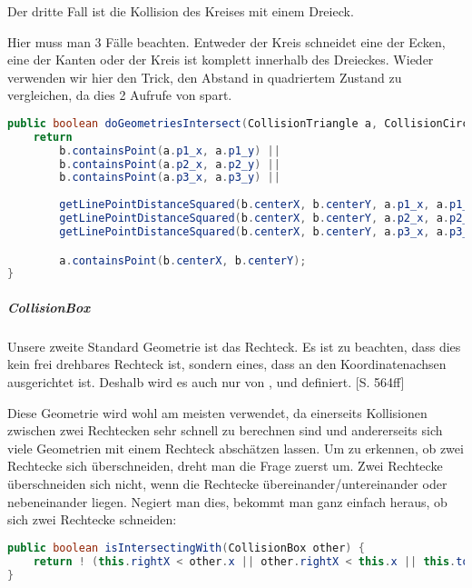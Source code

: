 Der dritte Fall ist die Kollision des Kreises mit einem Dreieck.

Hier muss man 3 Fälle beachten. Entweder der Kreis schneidet eine der Ecken, eine der Kanten oder der Kreis ist komplett innerhalb des Dreieckes. Wieder verwenden wir hier den Trick, den Abstand in quadriertem Zustand zu vergleichen, da dies 2 Aufrufe von  spart.


\doinline
\begin{lstlisting}[caption=Erkennen von Kollisionen (Kreis-Dreieck), title=\hspace{0 pt}, language=java]
public boolean doGeometriesIntersect(CollisionTriangle a, CollisionCircle b) {
	return 
		b.containsPoint(a.p1_x, a.p1_y) ||
		b.containsPoint(a.p2_x, a.p2_y) ||
		b.containsPoint(a.p3_x, a.p3_y) ||
		
		getLinePointDistanceSquared(b.centerX, b.centerY, a.p1_x, a.p1_y, a.p2_x, a.p2_y) <= (b.radius*b.radius) ||
		getLinePointDistanceSquared(b.centerX, b.centerY, a.p2_x, a.p2_y, a.p3_x, a.p3_y) <= (b.radius*b.radius) ||
		getLinePointDistanceSquared(b.centerX, b.centerY, a.p3_x, a.p3_y, a.p1_x, a.p1_y) <= (b.radius*b.radius) ||

		a.containsPoint(b.centerX, b.centerY);
}
\end{lstlisting}

\subparagraph{CollisionBox}

Unsere zweite Standard Geometrie ist das Rechteck. Es ist zu beachten, dass dies kein frei drehbares Rechteck ist, sondern eines, dass an den Koordinatenachsen ausgerichtet ist. Deshalb wird es auch nur von ,  und  definiert. \cite{EMFGAIA}[S. 564ff]

Diese Geometrie wird wohl am meisten verwendet, da einerseits Kollisionen zwischen zwei Rechtecken sehr schnell zu berechnen sind und andererseits sich viele Geometrien mit einem Rechteck abschätzen lassen. Um zu erkennen, ob zwei Rechtecke sich überschneiden, dreht man die Frage zuerst um. Zwei Rechtecke überschneiden sich nicht, wenn die Rechtecke übereinander/untereinander oder nebeneinander liegen. Negiert man dies, bekommt man ganz einfach heraus, ob sich zwei Rechtecke schneiden:

\doinline
\begin{lstlisting}[caption=Erkennen von Kollisionen (Box-Box), title=\hspace{0 pt}, language=java]
public boolean isIntersectingWith(CollisionBox other) {
	return ! (this.rightX < other.x || other.rightX < this.x || this.topY < other.y || other.topY < this.y);
}
\end{lstlisting}

